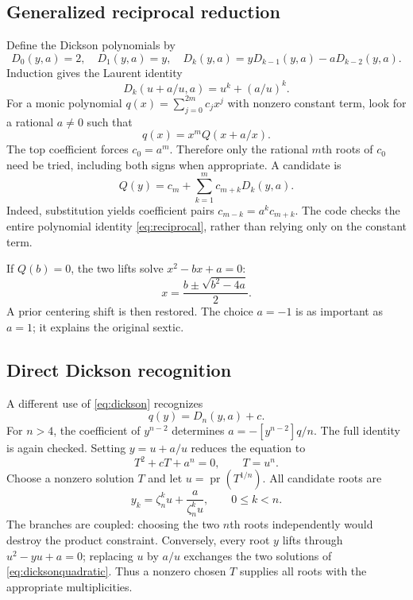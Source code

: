 \documentclass[11pt,letterpaper]{article}
\theoremstyle{definition}\newtheorem{definition}[theorem]{Definition}
\theoremstyle{remark}\newtheorem{remark}[theorem]{Remark}
\newcommand{\pr}{\operatorname{pr}}
\begin{document}
\subsection{Generalized reciprocal reduction}
Define the Dickson polynomials by
\begin{equation}\label{eq:dicksonrec}
 D_0(y,a)=2,\quad D_1(y,a)=y,\quad
 D_k(y,a)=yD_{k-1}(y,a)-aD_{k-2}(y,a).
\end{equation}
Induction gives the Laurent identity
\begin{equation}\label{eq:dickson}
 D_k(u+a/u,a)=u^k+(a/u)^k.
\end{equation}
For a monic polynomial $q(x)=\sum_{j=0}^{2m}c_jx^j$ with nonzero
constant term, look for a rational $a\ne0$ such that
\begin{equation}\label{eq:reciprocal}
 q(x)=x^mQ(x+a/x).
\end{equation}
The top coefficient forces $c_0=a^m$. Therefore only the rational $m$th
roots of $c_0$ need be tried, including both signs when appropriate. A
candidate is
\begin{equation}\label{eq:recipcandidate}
 Q(y)=c_m+\sum_{k=1}^{m}c_{m+k}D_k(y,a).
\end{equation}
Indeed, substitution yields coefficient pairs
$c_{m-k}=a^kc_{m+k}$. The code checks the entire polynomial identity
\eqref{eq:reciprocal}, rather than relying only on the constant term.

If $Q(b)=0$, the two lifts solve $x^2-bx+a=0$:
\begin{equation}\label{eq:quadraticlift}
 x=\frac{b\pm\sqrt{b^2-4a}}2.
\end{equation}
A prior centering shift is then restored. The choice $a=-1$ is as important
as $a=1$; it explains the original sextic.

\subsection{Direct Dickson recognition}
A different use of \eqref{eq:dickson} recognizes
\[
 q(y)=D_n(y,a)+c.
\]
For $n>4$, the coefficient of $y^{n-2}$ determines
$a=-[y^{n-2}]q/n$. The full identity is again checked. Setting
$y=u+a/u$ reduces the equation to
\begin{equation}\label{eq:dicksonquadratic}
 T^2+cT+a^n=0,\qquad T=u^n.
\end{equation}
Choose a nonzero solution $T$ and let $u=\pr(T^{1/n})$. All candidate roots
are
\begin{equation}\label{eq:coupled}
 y_k=\zeta_n^ku+\frac{a}{\zeta_n^ku},\qquad 0\leq k<n.
\end{equation}
The branches are coupled: choosing the two $n$th roots independently would
destroy the product constraint. Conversely, every root $y$ lifts through
$u^2-yu+a=0$; replacing $u$ by $a/u$ exchanges the two solutions of
\eqref{eq:dicksonquadratic}. Thus a nonzero chosen $T$ supplies all roots
with the appropriate multiplicities.
\end{document}
